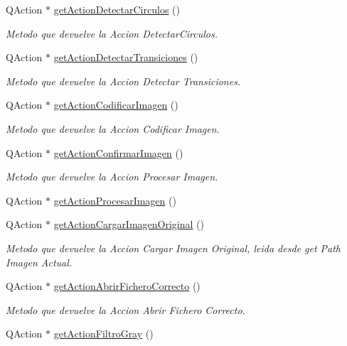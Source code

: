 \begin{DoxyCompactItemize}
Q\+Action $\ast$ \hyperlink{classCAplicacion_af4811205741a71ee2f897491119e2a85}{get\+Action\+Detectar\+Circulos} ()
\begin{DoxyCompactList}\small\item\em Metodo que devuelve la Accion Detectar\+Circulos. \end{DoxyCompactList}\item 
Q\+Action $\ast$ \hyperlink{classCAplicacion_a7ae388e051747fbc0aa9a47696d5d5da}{get\+Action\+Detectar\+Transiciones} ()
\begin{DoxyCompactList}\small\item\em Metodo que devuelve la Accion Detectar Transiciones. \end{DoxyCompactList}\item 
Q\+Action $\ast$ \hyperlink{classCAplicacion_a298625cc516fc874fd53f73fcf2ca883}{get\+Action\+Codificar\+Imagen} ()
\begin{DoxyCompactList}\small\item\em Metodo que devuelve la Accion Codificar Imagen. \end{DoxyCompactList}\item 
Q\+Action $\ast$ \hyperlink{classCAplicacion_a06f81531ef91b81f230c3fb377da0f64}{get\+Action\+Confirmar\+Imagen} ()
\begin{DoxyCompactList}\small\item\em Metodo que devuelve la Accion Procesar Imagen. \end{DoxyCompactList}\item 
Q\+Action $\ast$ \hyperlink{classCAplicacion_aba97c29b89e7c7b1163e3e3cde189e4b}{get\+Action\+Procesar\+Imagen} ()
\item 
Q\+Action $\ast$ \hyperlink{classCAplicacion_a00c192ecc07c4690802eb38c1f48731b}{get\+Action\+Cargar\+Imagen\+Original} ()
\begin{DoxyCompactList}\small\item\em Metodo que devuelve la Accion Cargar Imagen Original, leida desde get Path Imagen Actual. \end{DoxyCompactList}\item 
Q\+Action $\ast$ \hyperlink{classCAplicacion_a4b70b7b2987f70046fa1ea8c4ed02990}{get\+Action\+Abrir\+Fichero\+Correcto} ()
\begin{DoxyCompactList}\small\item\em Metodo que devuelve la Accion Abrir Fichero Correcto. \end{DoxyCompactList}\item 
Q\+Action $\ast$ \hyperlink{classCAplicacion_a45304c1304bedcde6c42cf3f9c7b4f19}{get\+Action\+Filtro\+Gray} ()

\end{DoxyCompactItemize}
